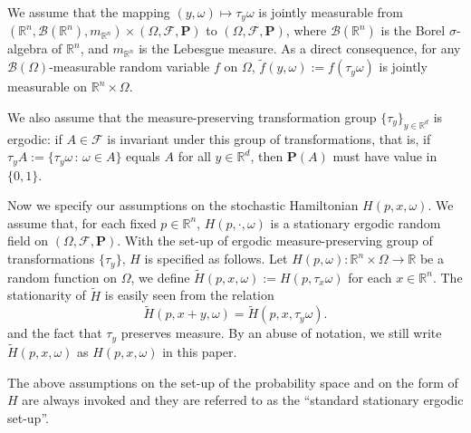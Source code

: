 \documentclass[11pt,reqno]{amsart}
\theoremstyle{definition}
\theoremstyle{remark}
\numberwithin{equation}{section}
\def\bP{\mathbf{P}}
\newcommand{\R}{{\mathbb{R}}}
\begin{document}
We assume that the mapping $(y,\omega)\mapsto\tau_{y}\omega $ is jointly measurable from $(\mathbb{R}^{n}, \mathscr{B}(\mathbb{R}^{n}), m_{\R^n}) \times (\Omega,\mathscr{F}, \mathbf{P})$ to $ (\Omega,\mathscr{F}, \mathbf{P})$, where $\mathscr{B}(\mathbb{R}^{n})$ is the Borel $\sigma$-algebra of $\mathbb{R}^n$, and $m_{\R^n}$ is the Lebesgue measure. As a direct consequence, for any $\mathcal{B}(\Omega)$-measurable random variable $f$ on $\Omega$, $\widetilde f(y,\omega):=f(\tau_{y}\omega)$ is jointly measurable on $\R^n\times \Omega$.

We also assume that the measure-preserving transformation group $\{\tau_y\}_{y\in \R^d}$ is ergodic: if $A \in \mathscr{F}$ is invariant under this group of transformations, that is, if $\tau_y A := \{\tau_y \omega\,:\, \omega\in A\}$ equals $A$ for all $y\in \R^d$, then $\bP(A)$ must have value in $\{0,1\}$.

Now we specify our assumptions on the stochastic Hamiltonian $H(p,x,\omega)$. We assume that, for each fixed $p\in\mathbb{R}^n$, $H(p,\cdot,\omega)$ is a stationary ergodic random field on $(\Omega, \mathscr{F}, \bP)$.  
With the set-up of ergodic measure-preserving group of transformations $\{\tau_y\}$, $H$ is specified as follows. Let $H(p,\omega):\mathbb{R}^n \times \Omega \rightarrow \mathbb{R}$ be a random function on $\Omega$, we define $\widetilde{H}(p,x,\omega):=H(p,\tau_{x}\omega)$ for each $x\in \mathbb{R}^n$. The stationarity of $\widetilde H$ is easily seen from the relation
\begin{equation*}
    \widetilde{H}(p,x+y,\omega) = \widetilde{H}(p,x,\tau_y\omega).
\end{equation*}
and the fact that $\tau_y$ preserves measure. By an abuse of notation, we still write $\tilde{H}(p,x,\omega)$ as $H(p,x,\omega)$ in this paper.

The above assumptions on the set-up of the probability space and on the form of $H$  are always invoked and they are referred to as the ``standard stationary ergodic set-up''. 
\end{document}
